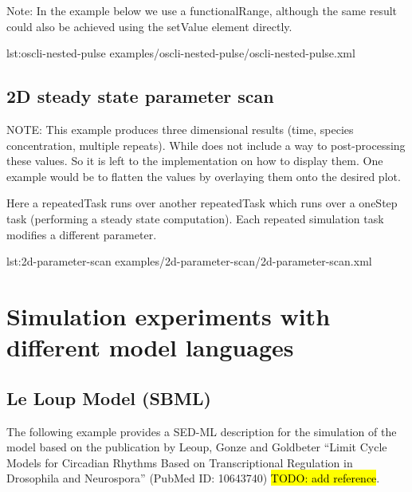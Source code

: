 Note: In the example below we use a functionalRange, although the same result could also be achieved using the setValue element directly.


{lst:oscli-nested-pulse}
{examples/oscli-nested-pulse/oscli-nested-pulse.xml}

\subsection{2D steady state parameter scan}
NOTE: This example produces three dimensional results (time, species concentration, multiple repeats). While \LoneVtwo does not include a way to post-processing these values. So it is left to the implementation on how to display them. One example would be to flatten the values by overlaying them onto the desired plot. 

Here a repeatedTask runs over another repeatedTask which runs over a oneStep task (performing a steady state computation). Each repeated simulation task modifies a different parameter.


{lst:2d-parameter-scan}
{examples/2d-parameter-scan/2d-parameter-scan.xml}

\section{Simulation experiments with different model languages}


\subsection{Le Loup Model (SBML)}
The following example provides a SED-ML description for the simulation of the model based on the publication by Leoup, Gonze and Goldbeter ``Limit Cycle Models for Circadian Rhythms Based on Transcriptional Regulation in Drosophila and Neurospora'' (PubMed ID: 10643740) \hl{TODO: add reference}.

